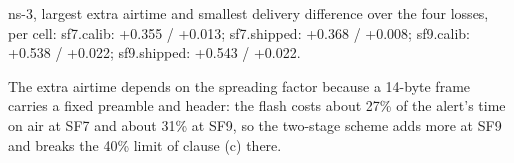 ns-3, largest extra airtime and smallest delivery difference over the four losses, per cell: sf7.calib: +0.355 / +0.013; sf7.shipped: +0.368 / +0.008; sf9.calib: +0.538 / +0.022; sf9.shipped: +0.543 / +0.022.

The extra airtime depends on the spreading factor because a 14-byte frame carries a fixed preamble and header: the flash costs about 27\% of the alert's time on air at SF7 and about 31\% at SF9, so the two-stage scheme adds more at SF9 and breaks the 40\% limit of clause (c) there.

